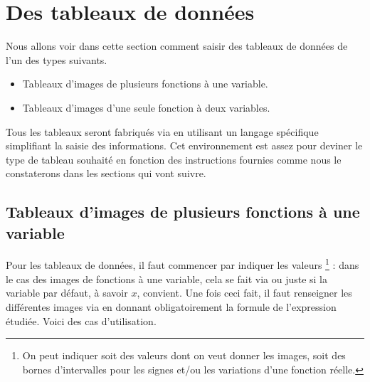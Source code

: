 \section{Des tableaux de données}

Nous allons voir dans cette section comment saisir des tableaux de données de l'un des types suivants.
\begin{itemize}
	\item Tableaux d'images de plusieurs fonctions à une variable.

	\item Tableaux d'images d'une seule fonction à deux variables.
\end{itemize}


\begin{tdocnote}
	Tous les tableaux seront fabriqués via  en utilisant un langage spécifique simplifiant la saisie des informations.
	Cet environnement est assez  pour deviner le type de tableau souhaité en fonction des instructions fournies comme nous le constaterons dans les sections qui vont suivre.
\end{tdocnote}





\subsection{Tableaux d'images de plusieurs fonctions à une variable}

Pour les tableaux de données, il faut commencer par indiquer les valeurs 
\footnote{
	 On peut indiquer soit des valeurs dont on veut donner les images, soit des bornes d'intervalles pour les signes et/ou les variations d'une fonction réelle.
} :
dans le cas des images de fonctions à une variable, cela se fait via
ou juste
si la variable par défaut, à savoir $x$, convient.
Une fois ceci fait, il faut renseigner les différentes images via  en donnant obligatoirement la formule de l'expression étudiée.
Voici des cas d'utilisation.




\begin{tdocexa}
    \leavevmode

\end{tdocexa}


